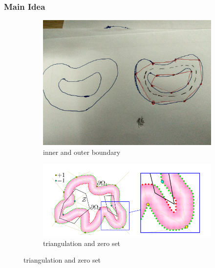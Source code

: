 \documentclass{beamer}
\begin{document}
\begin{frame}
  
\frametitle{Main Idea}
\begin{figure}
  \centering
  \begin{subfigure}[b]{0.48\textwidth}
    \centering
    \includegraphics[width=\textwidth]{main_idea}
    \caption{inner and outer boundary}
  \end{subfigure}
  \hfill
  \begin{subfigure}[b]{0.48\textwidth}
    \centering
    \includegraphics[width=\textwidth]{main_idea_2}
    \caption{triangulation and zero set}
  \end{subfigure}
\end{figure}
\end{frame}

\end{document}
